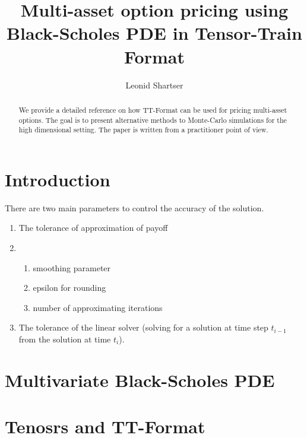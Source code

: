 \documentclass{article}
\title{Multi-asset option pricing using Black-Scholes PDE in Tensor-Train Format }
\author{Leonid Shartser}
\begin{document}
\maketitle
\begin{abstract}
    We provide a detailed reference on how TT-Format can be used for pricing multi-asset options.
    The goal is to present alternative methods to Monte-Carlo simulations for the high dimensional setting.
    The paper is written from a practitioner point of view.

 \end{abstract}
\section{Introduction}
There are two main parameters to control the accuracy of the solution.
\begin{enumerate}
    \item The tolerance of approximation of payoff
    \item 
        \begin{enumerate}
            \item smoothing parameter 
            \item epsilon for rounding
            \item number of approximating iterations
        \end{enumerate}
    \item The tolerance of the linear solver (solving for a solution at time step $t_{i-1}$ from the solution at time $t_{i}$).
    
\end{enumerate}

\section{Multivariate Black-Scholes PDE}

\section{Tenosrs and TT-Format}
\end{document}
